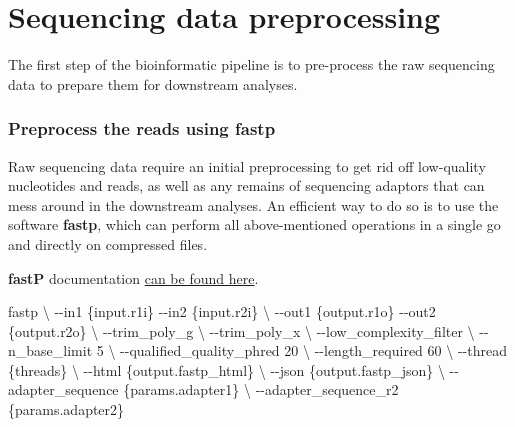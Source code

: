 \documentclass[
]{book}
\newenvironment{Shaded}{\begin{snugshade}}{\end{snugshade}}
\newcommand{\AttributeTok}[1]{\textcolor[rgb]{0.77,0.63,0.00}{#1}}
\newcommand{\DataTypeTok}[1]{\textcolor[rgb]{0.13,0.29,0.53}{#1}}
\newcommand{\ExtensionTok}[1]{#1}
\newcommand{\NormalTok}[1]{#1}
\begin{document}
\normalsize

\hypertarget{sequencing-data-preprocessing}{%
\chapter{Sequencing data preprocessing}\label{sequencing-data-preprocessing}}

The first step of the bioinformatic pipeline is to pre-process the raw sequencing data to prepare them for downstream analyses.

\hypertarget{preprocess-the-reads-using-fastp}{%
\subsection*{Preprocess the reads using fastp}\label{preprocess-the-reads-using-fastp}}

Raw sequencing data require an initial preprocessing to get rid off low-quality nucleotides and reads, as well as any remains of sequencing adaptors that can mess around in the downstream analyses. An efficient way to do so is to use the software \textbf{fastp}, which can perform all above-mentioned operations in a single go and directly on compressed files.

\textbf{fastP} documentation \href{https://github.com/OpenGene/fastp}{can be found here}.

\small

\begin{Shaded}
\begin{Highlighting}[]
\ExtensionTok{fastp} \DataTypeTok{\textbackslash{}}
    \AttributeTok{{-}{-}in1}\NormalTok{ \{input.r1i\} }\AttributeTok{{-}{-}in2}\NormalTok{ \{input.r2i\} }\DataTypeTok{\textbackslash{}}
    \AttributeTok{{-}{-}out1}\NormalTok{ \{output.r1o\} }\AttributeTok{{-}{-}out2}\NormalTok{ \{output.r2o\} }\DataTypeTok{\textbackslash{}}
    \AttributeTok{{-}{-}trim\_poly\_g} \DataTypeTok{\textbackslash{}}
    \AttributeTok{{-}{-}trim\_poly\_x} \DataTypeTok{\textbackslash{}}
    \AttributeTok{{-}{-}low\_complexity\_filter} \DataTypeTok{\textbackslash{}}
    \AttributeTok{{-}{-}n\_base\_limit}\NormalTok{ 5 }\DataTypeTok{\textbackslash{}}
    \AttributeTok{{-}{-}qualified\_quality\_phred}\NormalTok{ 20 }\DataTypeTok{\textbackslash{}}
    \AttributeTok{{-}{-}length\_required}\NormalTok{ 60 }\DataTypeTok{\textbackslash{}}
    \AttributeTok{{-}{-}thread}\NormalTok{ \{threads\} }\DataTypeTok{\textbackslash{}}
    \AttributeTok{{-}{-}html}\NormalTok{ \{output.fastp\_html\} }\DataTypeTok{\textbackslash{}}
    \AttributeTok{{-}{-}json}\NormalTok{ \{output.fastp\_json\} }\DataTypeTok{\textbackslash{}}
    \AttributeTok{{-}{-}adapter\_sequence}\NormalTok{ \{params.adapter1\} }\DataTypeTok{\textbackslash{}}
    \AttributeTok{{-}{-}adapter\_sequence\_r2}\NormalTok{ \{params.adapter2\}}
\end{Highlighting}
\end{Shaded}
\end{document}
